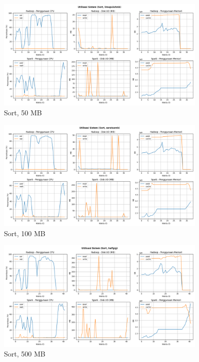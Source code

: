 \begin{figure}[h]
    \centering
    \includegraphics[width=0.9\textwidth]{figures/ch04/5-util-sistem-sort-limapuluhmb.png}
    \caption*{Sort, 50 MB}
\end{figure}

\begin{figure}[h]
    \centering
    \includegraphics[width=0.9\textwidth]{figures/ch04/5-util-sistem-sort-seratusmb.png}
    \caption*{Sort, 100 MB}
\end{figure}

\begin{figure}[h]
    \centering
    \includegraphics[width=0.9\textwidth]{figures/ch04/5-util-sistem-sort-halfgig.png}
    \caption*{Sort, 500 MB}
\end{figure}

